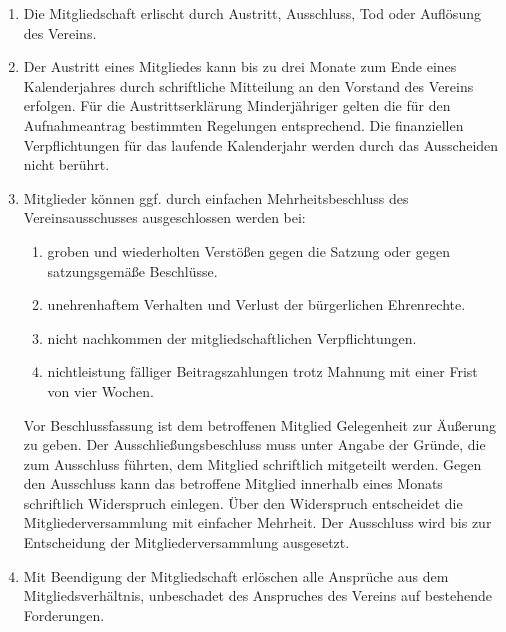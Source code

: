 \begin{enumerate}
    \item \label{sa:abs:vkcu80} Die Mitgliedschaft erlischt durch Austritt, Ausschluss, Tod oder Auflösung des Vereins.

    \item \label{sa:abs:knn8cx} Der Austritt eines Mitgliedes kann bis zu drei Monate zum Ende eines Kalenderjahres durch schriftliche Mitteilung an den Vorstand des Vereins erfolgen. Für die Austrittserklärung Minderjähriger gelten die für den Aufnahmeantrag bestimmten Regelungen entsprechend. Die finanziellen Verpflichtungen für das laufende Kalenderjahr werden durch das Ausscheiden nicht berührt.

    \item \label{sa:abs:ch5cfi} Mitglieder können ggf. durch einfachen Mehrheitsbeschluss des Vereinsausschusses ausgeschlossen werden bei:
    \begin{enumerate}
        \item groben und wiederholten Verstößen gegen die Satzung oder gegen satzungsgemäße Beschlüsse.

        \item unehrenhaftem Verhalten und Verlust der bürgerlichen Ehrenrechte.

        \item nicht nachkommen der mitgliedschaftlichen Verpflichtungen.

        \item nichtleistung fälliger Beitragszahlungen trotz Mahnung mit einer Frist von vier Wochen.
    \end{enumerate}
    Vor Beschlussfassung ist dem betroffenen Mitglied Gelegenheit zur Äußerung zu geben. Der Ausschließungsbeschluss muss unter Angabe der Gründe, die zum Ausschluss führten, dem Mitglied schriftlich mitgeteilt werden. Gegen den Ausschluss kann das betroffene Mitglied innerhalb eines Monats schriftlich Widerspruch einlegen. Über den Widerspruch entscheidet die Mitgliederversammlung mit einfacher Mehrheit. Der Ausschluss wird bis zur Entscheidung der Mitgliederversammlung ausgesetzt.

    \item \label{sa:abs:bmn9wa} Mit Beendigung der Mitgliedschaft erlöschen alle Ansprüche aus dem Mitgliedsverhältnis, unbeschadet des Anspruches des Vereins auf bestehende Forderungen.
\end{enumerate}

